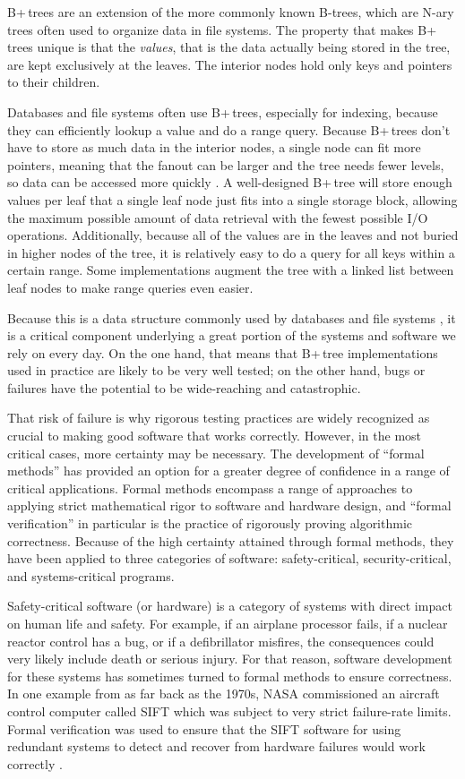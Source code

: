 \documentclass[12pt]{article}
\begin{document}
B+\,trees are an extension of the more commonly known B-trees, which are N-ary trees often used to organize data in file systems. The property that makes B+\,trees unique is that the \textit{values}, that is the data actually being stored in the tree, are kept exclusively at the leaves. The interior nodes hold only keys and pointers to their children.

Databases and file systems often use B+\,trees, especially for indexing, because they can efficiently lookup a value and do a range query. Because B+\,trees don’t have to store as much data in the interior nodes, a single node can fit more pointers, meaning that the fanout can be larger and the tree needs fewer levels, so data can be accessed more quickly \cite{elmasri_navathe_2011}. A well-designed B+\,tree will store enough values per leaf that a single leaf node just fits into a single storage block, allowing the maximum possible amount of data retrieval with the fewest possible I/O operations. Additionally, because all of the values are in the leaves and not buried in higher nodes of the tree, it is relatively easy to do a query for all keys within a certain range. Some implementations augment the tree with a linked list between leaf nodes to make range queries even easier.

Because this is a data structure commonly used by databases and file systems \cite{elmasri_navathe_2011}, it is a critical component underlying a great portion of the systems and software we rely on every day. On the one hand, that means that B+\,tree implementations used in practice are likely to be very well tested; on the other hand, bugs or failures have the potential to be wide-reaching and catastrophic.

That risk of failure is why rigorous testing practices are widely recognized as crucial to making good software that works correctly. However, in the most critical cases, more certainty may be necessary. The development of “formal methods” has provided an option for a greater degree of confidence in a range of critical applications. Formal methods encompass a range of approaches to applying strict mathematical rigor to software and hardware design, and “formal verification” in particular is the practice of rigorously proving algorithmic correctness. Because of the high certainty attained through formal methods, they have been applied to three categories of software: safety-critical, security-critical, and systems-critical programs.

Safety-critical software (or hardware) is a category of systems with direct impact on human life and safety. For example, if an airplane processor fails, if a nuclear reactor control has a bug, or if a defibrillator misfires, the consequences could very likely include death or serious injury. For that reason, software development for these systems has sometimes turned to formal methods to ensure correctness. In one example from as far back as the 1970s, NASA commissioned an aircraft control computer called SIFT which was subject to very strict failure-rate limits. Formal verification was used to ensure that the SIFT software for using redundant systems to detect and recover from hardware failures would work correctly \cite{225554}.
\end{document}
